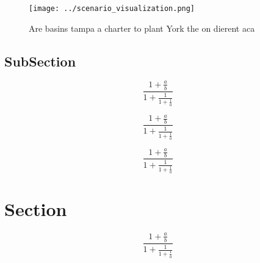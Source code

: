 \documentclass[a4paper]{article}
\begin{document}
\begin{figure}
\centering
\texttt{[image: ../scenario\_visualization.png]}
\caption{Are basins tampa a charter to plant York the on dierent aca
}
\end{figure}
 
\subsection{SubSection}

\[ \frac{1+\frac{a}{b}}{1+\frac{1}{1+\frac{1}{a}}} \]

\[ \frac{1+\frac{a}{b}}{1+\frac{1}{1+\frac{1}{a}}} \]

\[ \frac{1+\frac{a}{b}}{1+\frac{1}{1+\frac{1}{a}}} \]

\section{Section}

\[ \frac{1+\frac{a}{b}}{1+\frac{1}{1+\frac{1}{a}}} \]
\end{document}

